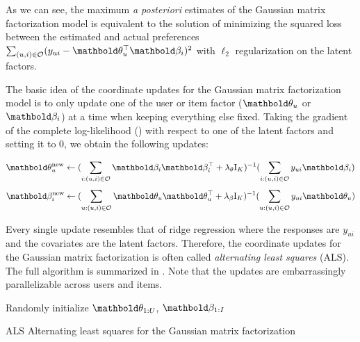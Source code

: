 As we can see, the maximum \emph{a posteriori} estimates of the Gaussian matrix factorization model is equivalent to the solution of minimizing the squared loss between the estimated and actual preferences $\sum_{(u, i)\in \mathcal{O}} (y_{ui} - \mb\theta_u^\top\mb\beta_i)^2$ with $\ell_2$ regularization on the latent factors.

The basic idea of the coordinate updates for the Gaussian matrix factorization model is to only update one of the user or item factor ($\mb\theta_u$ or $\mb\beta_i$) at a time when keeping everything else fixed. Taking the gradient of the complete log-likelihood () with respect to one of the latent factors and setting it to $0$, we obtain the following updates:

\begin{equation}
\mb\theta_u^\new \leftarrow (\sum_{i: (u, i) \in \cO} \mb\beta_i \mb\beta_i^\top + \lambda_\theta \mathrm{I}_K)^{-1} (\sum_{i: (u, i) \in \cO} y_{ui} \mb\beta_i)
\label{chpt:background:eq:als_user}
\end{equation}
\begin{equation}
\mb\beta_i^\new \leftarrow (\sum_{u: (u, i)\in\cO} \mb\theta_u \mb\theta_u^\top + \lambda_\beta \mathrm{I}_K)^{-1} (\sum_{u: (u, i)\in\cO} y_{ui} \mb\theta_u)
\label{chpt:background:eq:als_item}
\end{equation}

Every single update resembles that of ridge regression \citep{friedman2001elements} where the responses are $y_{ui}$ and the covariates are the latent factors. Therefore, the coordinate updates for the Gaussian matrix factorization is often called \textit{alternating least squares} (ALS). The full algorithm is summarized in . Note that the updates are embarrassingly parallelizable across users and items. 

\begin{algorithm}
\DontPrintSemicolon %
Randomly initialize $\mb\theta_{1:U}$, $\mb\beta_{1:I}$\;
\;
\caption{{\sc ALS} Alternating least squares for the Gaussian matrix factorization}
\label{chpt:background:algo:gmf}
\end{algorithm}

